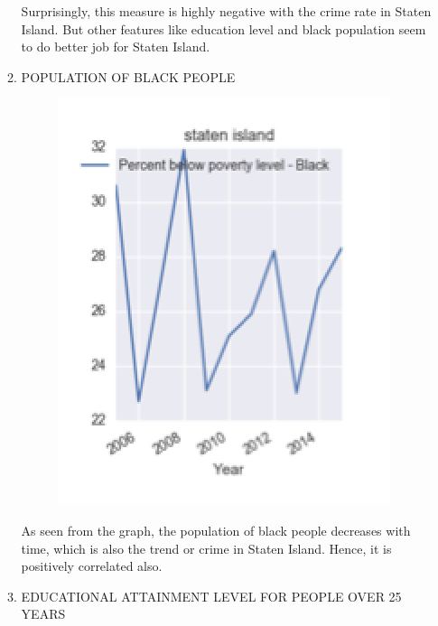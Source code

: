 \documentclass{article}
\begin{document}
\begin{itemize}
\begin{enumerate}[label=(\alph*)]
Surprisingly, this measure is highly negative with the crime rate in Staten Island. But other features like education level and black population seem to do better job for Staten Island.

\item POPULATION OF BLACK PEOPLE

\begin{figure}[H]
\centering
\includegraphics[scale=1]{SIBlack.png}
\end{figure}

As seen from the graph, the population of black people decreases with time, which is also the trend or crime in Staten Island. Hence, it is positively correlated also.

\item EDUCATIONAL ATTAINMENT LEVEL FOR PEOPLE OVER 25 YEARS


\end{enumerate}
\end{itemize}
\end{document}
